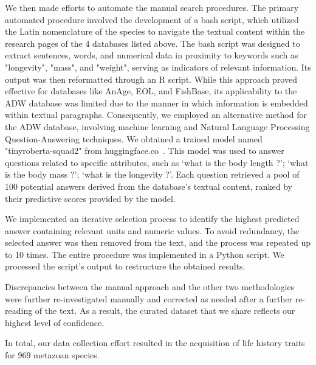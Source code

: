 We then made efforts to automate the manual search procedures. The primary automated procedure involved the development of a bash script, which utilized the Latin nomenclature of the species to navigate the textual content within the research pages of the 4 databases listed above. The bash script was designed to extract sentences, words, and numerical data in proximity to keywords such as "longevity", "mass", and "weight", serving as indicators of relevant information.
Its output was then reformatted through an R script. While this approach proved effective for databases like AnAge, EOL, and FishBase, its applicability to the \acrshort{ADW} database was limited due to the manner in which information is embedded within textual paragraphs.
Consequently, we employed an alternative method for the \acrshort{ADW} database, involving machine learning and Natural Language Processing Question-Answering techniques. We obtained a trained model named "tinyroberta-squad2" from huggingface.co~\cite{wolf_huggingfaces_2020}. This model was used to answer questions related to specific attributes, such as `what is the body length ?'; `what is the body mass ?'; `what is the longevity ?'. Each question retrieved a pool of 100 potential answers derived from the database's textual content, ranked by their predictive scores provided by the model. 

We implemented an iterative selection process to identify the highest predicted answer containing relevant units and numeric values. To avoid redundancy, the selected answer was then removed from the text, and the process was repeated up to 10 times. The entire procedure was implemented in a Python script. We processed the script's output to restructure the obtained results.

Discrepancies between the manual approach and the other two methodologies were further re-investigated manually and corrected as needed after a further re-reading of the text. As a result, the curated dataset that we share reflects our highest level of confidence.

In total, our data collection effort resulted in the acquisition of life history traits for 969 metazoan species.

